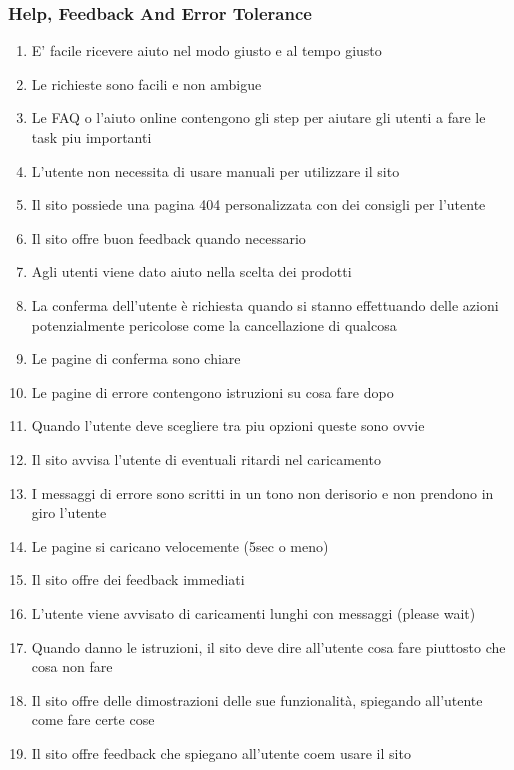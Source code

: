 \documentclass[../Report.tex]{subfiles}
\begin{document}
    \subsubsection{Help, Feedback And Error Tolerance}
    \begin{enumerate}
        \item E’ facile ricevere aiuto nel modo giusto e al tempo giusto 
        \item Le richieste sono facili e non ambigue
        \item Le FAQ o l’aiuto online contengono gli step per aiutare gli utenti a fare le task piu importanti 
        \item L’utente non necessita di usare manuali per utilizzare il sito 
        \item Il sito possiede una pagina 404 personalizzata con dei consigli per l’utente 
        \item Il sito offre buon feedback quando necessario 
        \item Agli utenti viene dato aiuto nella scelta dei prodotti 
        \item La conferma dell’utente è richiesta quando si stanno effettuando delle azioni potenzialmente pericolose come la cancellazione di qualcosa 
        \item Le pagine di conferma sono chiare 
        \item Le pagine di errore contengono istruzioni su cosa fare dopo 
        \item Quando l’utente deve scegliere tra piu opzioni queste sono ovvie 
        \item Il sito avvisa l’utente di eventuali ritardi nel caricamento 
        \item I messaggi di errore sono scritti in un tono non derisorio e non prendono in giro l’utente 
        \item Le pagine si caricano velocemente (5sec o meno)
        \item Il sito offre dei feedback immediati 
        \item L’utente viene avvisato di caricamenti lunghi con messaggi (please wait)
        \item Quando danno le istruzioni, il sito deve dire all’utente cosa fare piuttosto che cosa non fare 
        \item Il sito offre delle dimostrazioni delle sue funzionalità, spiegando all’utente come fare certe cose 
        \item Il sito offre feedback che spiegano all’utente coem usare il sito 

\end{enumerate}
\end{document}
